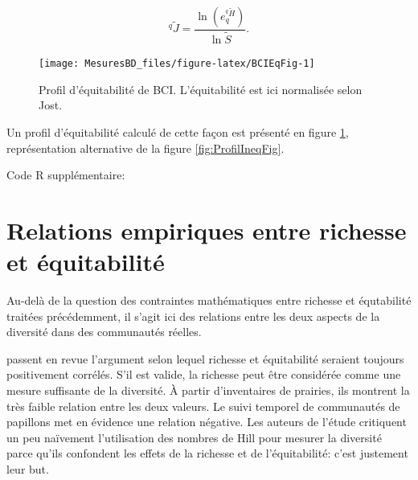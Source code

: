\documentclass[
  11pt,
  french,
  a4paper,
  extrafontsizes,onecolumn,openright
  ]{memoir}
\newenvironment{Shaded}{\begin{snugshade}}{\end{snugshade}}
\newcommand{\AttributeTok}[1]{\textcolor[rgb]{0.13,0.29,0.53}{#1}}
\newcommand{\FunctionTok}[1]{\textcolor[rgb]{0.13,0.29,0.53}{\textbf{#1}}}
\newcommand{\NormalTok}[1]{#1}
\newcommand{\OtherTok}[1]{\textcolor[rgb]{0.56,0.35,0.01}{#1}}
\newcommand{\SpecialCharTok}[1]{\textcolor[rgb]{0.81,0.36,0.00}{\textbf{#1}}}
\newcommand{\StringTok}[1]{\textcolor[rgb]{0.31,0.60,0.02}{#1}}
\newlength{\rf}
\begin{document}
\begin{equation}
  \label{eq:EstJq}
  ^q\!{\tilde{J}}= \frac{\ln\left(e_q^{^q{\tilde{H}}} \right)}{\ln\tilde{S}}.
\end{equation}



\scriptsize

\begin{figure}

{\centering \texttt{[image: MesuresBD\_files/figure-latex/BCIEqFig-1]} 

}

\caption{Profil d'équitabilité de BCI. L'équitabilité est ici normalisée selon Jost.}\label{fig:BCIEqFig}
\end{figure}

\normalsize

Un profil d'équitabilité calculé de cette façon est présenté en figure \ref{fig:BCIEqFig}, représentation alternative de la figure \ref{fig:ProfilIneqFig}.

Code R supplémentaire:

\scriptsize

\begin{Shaded}
\end{Shaded}

\normalsize

\section{Relations empiriques entre richesse et équitabilité}\label{relations-empiriques-entre-richesse-et-uxe9quitabilituxe9}

Au-delà de la question des contraintes mathématiques entre richesse et équtabilité traitées précédemment, il s'agit ici des relations entre les deux aspects de la diversité dans des communautés réelles.

\textcite{Wilsey2005} passent en revue l'argument selon lequel richesse et équitabilité seraient toujours positivement corrélés.
S'il est valide, la richesse peut être considérée comme une mesure suffisante de la diversité.
À partir d'inventaires de prairies, ils montrent la très faible relation entre les deux valeurs.
Le suivi temporel de communautés de papillons \autocite{MacDonald2016} met en évidence une relation négative.
Les auteurs de l'étude critiquent un peu naïvement l'utilisation des nombres de Hill pour mesurer la diversité parce qu'ils confondent les effets de la richesse et de l'équitabilité: c'est justement leur but.
\end{document}
